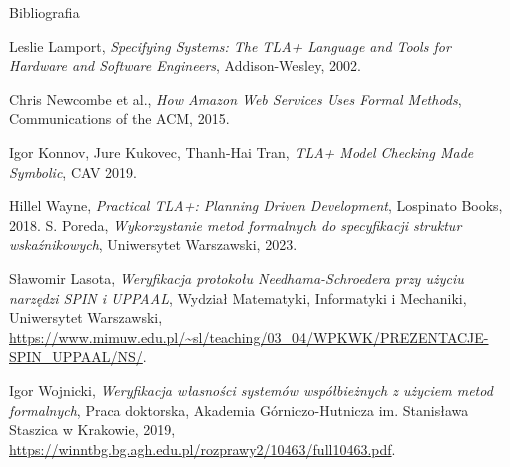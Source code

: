 \documentclass{beamer}
\begin{document}
\begin{frame}{Bibliografia}
  \scriptsize
  \begin{thebibliography}{9}
  
    Leslie Lamport, \emph{Specifying Systems: The TLA+ Language and Tools for Hardware and Software Engineers}, Addison-Wesley, 2002.
  
    Chris Newcombe et al., \emph{How Amazon Web Services Uses Formal Methods}, Communications of the ACM, 2015.
  
    Igor Konnov, Jure Kukovec, Thanh-Hai Tran, \emph{TLA+ Model Checking Made Symbolic}, CAV 2019.
  
    Hillel Wayne, \emph{Practical TLA+: Planning Driven Development}, Lospinato Books, 2018.
    S. Poreda,
    \textit{Wykorzystanie metod formalnych do specyfikacji struktur wskaźnikowych},
    Uniwersytet Warszawski, 2023.

    Sławomir Lasota,
    \textit{Weryfikacja protokołu Needhama-Schroedera przy użyciu narzędzi SPIN i UPPAAL},
    Wydział Matematyki, Informatyki i Mechaniki, Uniwersytet Warszawski,
    \url{https://www.mimuw.edu.pl/~sl/teaching/03_04/WPKWK/PREZENTACJE-SPIN_UPPAAL/NS/}.

    Igor Wojnicki,
    \textit{Weryfikacja własności systemów współbieżnych z użyciem metod formalnych},
    Praca doktorska, Akademia Górniczo-Hutnicza im. Stanisława Staszica w Krakowie, 2019,
    \url{https://winntbg.bg.agh.edu.pl/rozprawy2/10463/full10463.pdf}.
        
  \end{thebibliography}
\end{frame}
\end{document}
